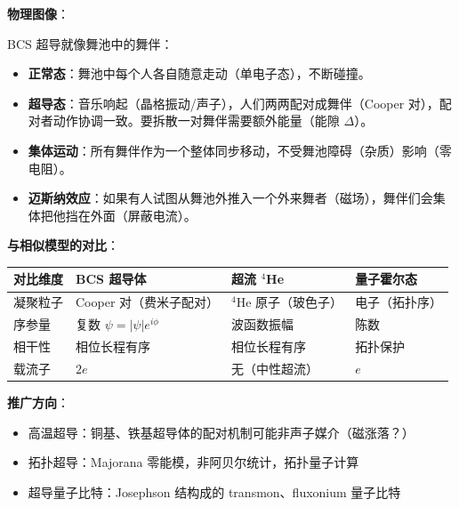 \begin{insightbox}[物理图像与模型关联]
\textbf{物理图像}：

BCS 超导就像舞池中的舞伴：
\begin{itemize}[nosep]
    \item \textbf{正常态}：舞池中每个人各自随意走动（单电子态），不断碰撞。
    \item \textbf{超导态}：音乐响起（晶格振动/声子），人们两两配对成舞伴（Cooper 对），配对者动作协调一致。要拆散一对舞伴需要额外能量（能隙 $\Delta$）。
    \item \textbf{集体运动}：所有舞伴作为一个整体同步移动，不受舞池障碍（杂质）影响（零电阻）。
    \item \textbf{迈斯纳效应}：如果有人试图从舞池外推入一个外来舞者（磁场），舞伴们会集体把他挡在外面（屏蔽电流）。
\end{itemize}

\textbf{与相似模型的对比}：
\begin{center}
\begin{tabular}{llll}
\toprule
\textbf{对比维度} & \textbf{BCS 超导体} & \textbf{超流 $^4$He} & \textbf{量子霍尔态} \\
\midrule
凝聚粒子 & Cooper 对（费米子配对） & $^4$He 原子（玻色子） & 电子（拓扑序） \\
序参量 & 复数 $\psi=|\psi|e^{i\phi}$ & 波函数振幅 & 陈数 \\
相干性 & 相位长程有序 & 相位长程有序 & 拓扑保护 \\
载流子 & $2e$ & 无（中性超流） & $e$ \\
\bottomrule
\end{tabular}
\end{center}

\textbf{推广方向}：
\begin{itemize}[nosep]
    \item 高温超导：铜基、铁基超导体的配对机制可能非声子媒介（磁涨落？）
    \item 拓扑超导：Majorana 零能模，非阿贝尔统计，拓扑量子计算
    \item 超导量子比特：Josephson 结构成的 transmon、fluxonium 量子比特
\end{itemize}
\end{insightbox}

